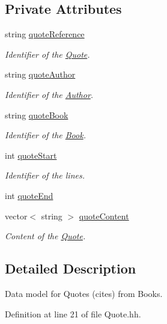 \subsection*{Private Attributes}
\begin{DoxyCompactItemize}
\item 
string \hyperlink{class_quote_a9c7b2deff2ee9a0a216c360fe304202a}{quote\-Reference}
\begin{DoxyCompactList}\small\item\em Identifier of the \hyperlink{class_quote}{Quote}. \end{DoxyCompactList}\item 
string \hyperlink{class_quote_a930113c4ee0ae5e5506bbc1ea3e79b49}{quote\-Author}
\begin{DoxyCompactList}\small\item\em Identifier of the \hyperlink{class_author}{Author}. \end{DoxyCompactList}\item 
string \hyperlink{class_quote_a7e6968e086bdd45b40627a37ecbbf6fc}{quote\-Book}
\begin{DoxyCompactList}\small\item\em Identifier of the \hyperlink{class_book}{Book}. \end{DoxyCompactList}\item 
int \hyperlink{class_quote_ac426122ac24638740b2a5c5e8342e8c9}{quote\-Start}
\begin{DoxyCompactList}\small\item\em Identifier of the lines. \end{DoxyCompactList}\item 
int \hyperlink{class_quote_aa5953a477b96183c8dc2fc8a42001c29}{quote\-End}
\item 
vector$<$ string $>$ \hyperlink{class_quote_a0ffcb584920e14d7dd5c45820997f989}{quote\-Content}
\begin{DoxyCompactList}\small\item\em Content of the \hyperlink{class_quote}{Quote}. \end{DoxyCompactList}\end{DoxyCompactItemize}


\subsection{Detailed Description}
Data model for Quotes (cites) from Books. 

Definition at line 21 of file Quote.\-hh.



